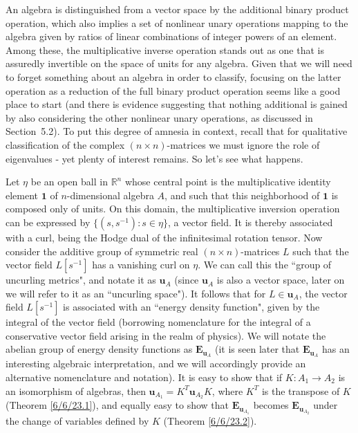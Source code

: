 \documentclass{amsart}
\numberwithin{equation}{section}
\theoremstyle{definition}
\numberwithin{theorem}{section}
\begin{document}
An algebra is distinguished from a vector space by the additional binary product operation, which also implies a set of nonlinear unary operations mapping to the algebra given by ratios of linear combinations of integer powers of an element.  Among these, the multiplicative inverse operation stands out as one that is assuredly invertible on the space of units for any algebra. Given that we will need to forget something about an algebra in order to classify, focusing on the latter operation as a reduction of the full binary product operation seems like a good place to start (and there is evidence suggesting that nothing additional is gained by also considering the other nonlinear unary operations, as discussed in \mbox{Section 5.2}).  To put this degree of amnesia in context, recall that for qualitative classification of the complex $(n\times n)$-matrices we must ignore the role of eigenvalues - yet plenty of interest remains.  So let's see what happens.

Let $\eta$ be an open ball in $\mathbb{R}^n$ whose central point is the multiplicative identity element $\mathbf{1}$ of $n$-dimensional algebra $A$, and such that this neighborhood of $\mathbf{1}$ is composed only of units.  On this domain, the multiplicative inversion operation can be expressed by $\{(s,s^{-1}):s\in\eta\}$, a vector field.  It is thereby associated with a curl, being the Hodge dual of the infinitesimal rotation tensor.  Now consider the additive group of symmetric real $(n\times n)$-matrices $L$ such that the vector field $L[s^{-1}]$ has a vanishing curl on $\eta$.  We can call this the ``group of uncurling metrics", and notate it as $\mathbf{u}_A$ (since $\mathbf{u}_A$ is also a vector space, later on we will refer to it as an ``uncurling space").   It follows that for $L\in \mathbf{u}_A$, the vector field $L[s^{-1}]$ is associated with an ``energy density function", given by the integral of the vector field (borrowing nomenclature for the integral of a conservative vector field arising in the realm of physics).   
 We will notate the abelian group of energy density functions as $\mathbf{E}_{\mathbf{u}_A}$ (it is seen later that $\mathbf{E}_{\mathbf{u}_A}$ has an interesting algebraic interpretation, and we will accordingly provide an alternative nomenclature and notation).  It is easy to show that if $K:A_1\rightarrow A_2$ is an isomorphism of algebras, then $\mathbf{u}_{A_1} = K^T \mathbf{u}_{A_2}K $,  where $K^T$ is the transpose of $K$ (Theorem \ref{6/6/23.1}), and equally easy to show that $\mathbf{E}_{\mathbf{u}_{A_1}}$ becomes $\mathbf{E}_{\mathbf{u}_{A_2}}$ under the change of variables defined by $K$ (Theorem \ref{6/6/23.2}).  
\end{document}
